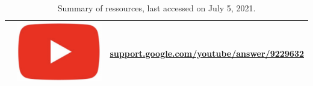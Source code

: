 \documentclass{article}
\begin{document}
\begin{table}[h]
\begin{tabular}{|c|c|c|}
                                           & \includegraphics[scale=0.03]{./img/yt_logo.png}  & \href{https://support.google.com/youtube/answer/9229632}{support.google.com/youtube/answer/9229632}                                  \\ \hline
                                           
                                           
                                           
                                           
\end{tabular}
\caption{Summary of ressources, last accessed on July 5, 2021. }
\label{summary}
\end{table}

\end{document}
